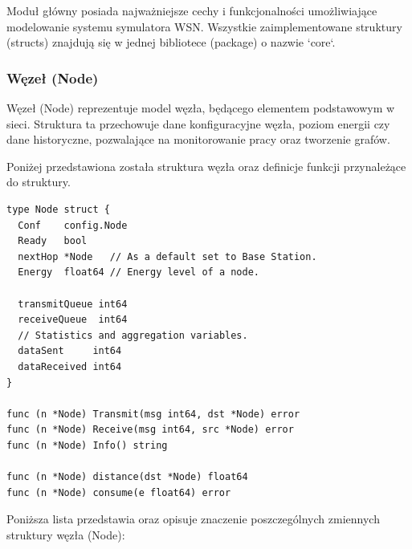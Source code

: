 \documentclass[a4paper,12pt,twoside,openany]{report}
\begin{document}
Moduł główny posiada najważniejsze cechy i funkcjonalności umożliwiające modelowanie systemu symulatora WSN.
Wszystkie zaimplementowane struktury (structs) znajdują się w jednej bibliotece (package) o nazwie `core`.

\subsubsection{Węzeł (Node)}

Węzeł (Node) reprezentuje model węzła, będącego elementem podstawowym w sieci. Struktura ta przechowuje dane konfiguracyjne węzła,
poziom energii czy dane historyczne, pozwalające na monitorowanie pracy oraz tworzenie grafów.

Poniżej przedstawiona została struktura węzła oraz definicje funkcji przynależące do struktury.

\begin{lstlisting}
type Node struct {
  Conf    config.Node
  Ready   bool
  nextHop *Node   // As a default set to Base Station.
  Energy  float64 // Energy level of a node.

  transmitQueue int64
  receiveQueue  int64
  // Statistics and aggregation variables.
  dataSent     int64
  dataReceived int64
}

func (n *Node) Transmit(msg int64, dst *Node) error
func (n *Node) Receive(msg int64, src *Node) error
func (n *Node) Info() string

func (n *Node) distance(dst *Node) float64
func (n *Node) consume(e float64) error
\end{lstlisting}

Poniższa lista przedstawia oraz opisuje znaczenie poszczególnych zmiennych struktury węzła (Node):
\end{document}
